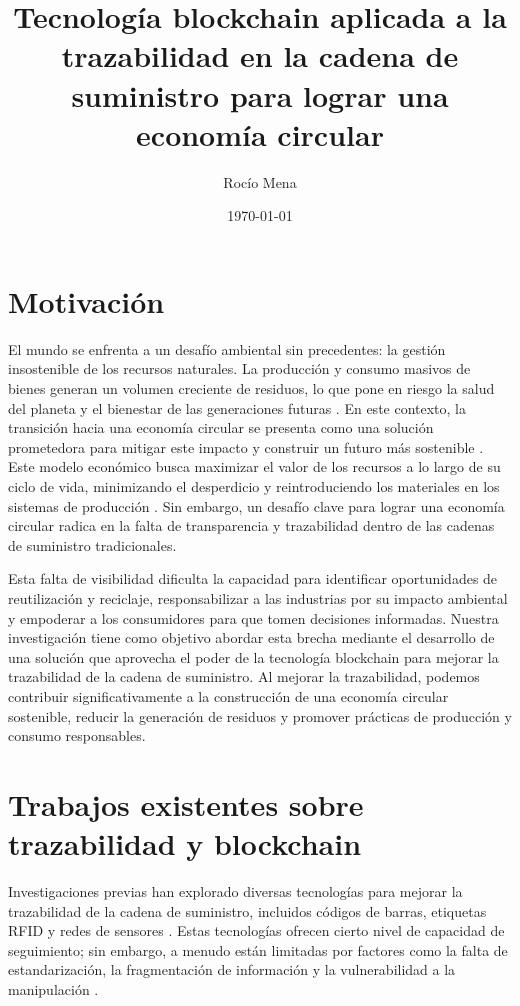 \documentclass{article}
\title{Tecnología blockchain aplicada a la trazabilidad en la cadena de suministro para lograr una economía circular}
\author{Rocío Mena}
\date{\today}
\begin{document}
\maketitle

\section{Motivación}

El mundo se enfrenta a un desafío ambiental sin precedentes: la gestión insostenible de los recursos naturales. La producción y consumo masivos de bienes generan un volumen creciente de residuos, lo que pone en riesgo la salud del planeta y el bienestar de las generaciones futuras \cite{IPCC2022, pelegri2021ipcc}. En este contexto, la transición hacia una economía circular se presenta como una solución prometedora para mitigar este impacto y construir un futuro más sostenible \cite{clima2022book}. Este modelo económico busca maximizar el valor de los recursos a lo largo de su ciclo de vida, minimizando el desperdicio y reintroduciendo los materiales en los sistemas de producción \cite{da2022economia, melendez2021economia}. Sin embargo, un desafío clave para lograr una economía circular radica en la falta de transparencia y trazabilidad dentro de las cadenas de suministro tradicionales.

Esta falta de visibilidad dificulta la capacidad para identificar oportunidades de reutilización y reciclaje, responsabilizar a las industrias por su impacto ambiental y empoderar a los consumidores para que tomen decisiones informadas. Nuestra investigación tiene como objetivo abordar esta brecha mediante el desarrollo de una solución que aprovecha el poder de la tecnología blockchain para mejorar la trazabilidad de la cadena de suministro. Al mejorar la trazabilidad, podemos contribuir significativamente a la construcción de una economía circular sostenible, reducir la generación de residuos y promover prácticas de producción y consumo responsables.

\section{Trabajos existentes sobre trazabilidad y blockchain}

Investigaciones previas han explorado diversas tecnologías para mejorar la trazabilidad de la cadena de suministro, incluidos códigos de barras, etiquetas RFID y redes de sensores \cite{pending}. Estas tecnologías ofrecen cierto nivel de capacidad de seguimiento; sin embargo, a menudo están limitadas por factores como la falta de estandarización, la fragmentación de información y la vulnerabilidad a la manipulación \cite{pending}.
\end{document}

